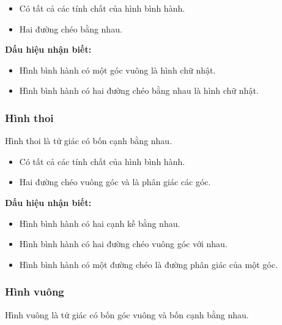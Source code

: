 \documentclass[12pt,a4paper]{article}
\begin{document}
\begin{tinhchat}
  \begin{itemize}
    \item Có tất cả các tính chất của hình bình hành.
    \item Hai đường chéo bằng nhau.
  \end{itemize}
\end{tinhchat}

\medskip\noindent\textbf{Dấu hiệu nhận biết:}
\begin{itemize}
  \item Hình bình hành có một góc vuông là hình chữ nhật.
  \item Hình bình hành có hai đường chéo bằng nhau là hình chữ nhật.
\end{itemize}

\subsubsection{Hình thoi}

\begin{dinhnghia}
  Hình thoi là tứ giác có bốn cạnh bằng nhau.
\end{dinhnghia}

\begin{tinhchat}
  \begin{itemize}
    \item Có tất cả các tính chất của hình bình hành.
    \item Hai đường chéo vuông góc và là phân giác các góc.
  \end{itemize}
\end{tinhchat}

\medskip\noindent\textbf{Dấu hiệu nhận biết:}
\begin{itemize}
  \item Hình bình hành có hai cạnh kề bằng nhau.
  \item Hình bình hành có hai đường chéo vuông góc với nhau.
  \item Hình bình hành có một đường chéo là đường phân giác của một góc.
\end{itemize}

\subsubsection{Hình vuông}

\begin{dinhnghia}
  Hình vuông là tứ giác có bốn góc vuông và bốn cạnh bằng nhau.
\end{dinhnghia}
\end{document}
